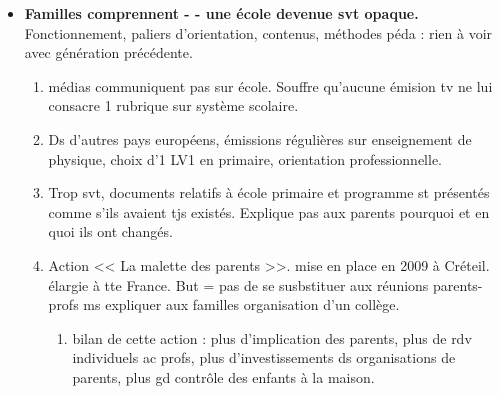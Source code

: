 \documentclass[12pt]{report}
\begin{document}
\begin{itemize}
\begin{itemize}
\item \textbf{Familles comprennent - - une école devenue svt opaque.} Fonctionnement, paliers d'orientation, contenus, méthodes péda : rien à voir avec génération précédente.\\
\begin{enumerate}
\item médias communiquent pas sur école. Souffre qu'aucune émision tv ne lui consacre 1 rubrique sur système scolaire.\\
\item Ds d'autres pays européens, émissions régulières sur enseignement de physique, choix d'1 LV1 en primaire, orientation professionnelle.\\
\item Trop svt, documents relatifs à école primaire et programme st présentés comme s'ils avaient tjs existés. Explique pas aux parents pourquoi et en quoi ils ont changés.\\
\item Action << La malette des parents >>. mise en place en 2009 à Créteil. élargie à tte France. But = pas de se susbstituer aux réunions parents-profs ms expliquer aux familles organisation d'un collège.\\
\begin{enumerate}
\item bilan de cette action : plus d'implication des parents, plus de rdv individuels ac profs, plus d'investissements ds organisations de parents, plus gd contrôle des enfants à la maison.\\
\end{enumerate}
\end{enumerate}


\end{itemize}
\end{itemize}
\end{document}
